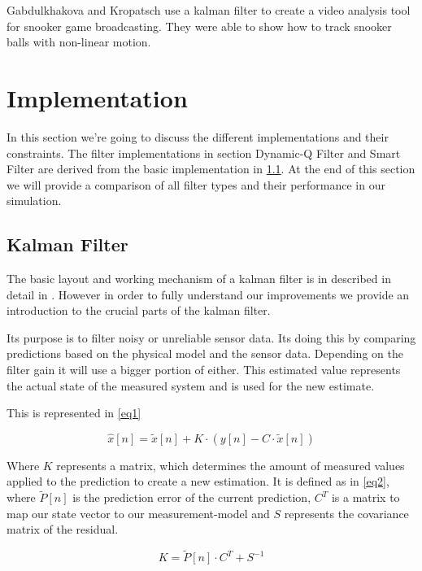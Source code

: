 \documentclass[titlepage, a4paper, 11pt]{scrartcl}
\begin{document}
Gabdulkhakova and Kropatsch \cite{kropatsch} use a kalman filter to create a video analysis tool for snooker game broadcasting.
They were able to show how to track snooker balls with non-linear motion.

\section{Implementation} \label{implementation}
In this section we're going to discuss the different implementations and their constraints. The filter implementations in section Dynamic-Q Filter and Smart Filter are derived from
the basic implementation in \cref{kalman-basic}. At the end of this section we will provide a comparison of all filter types and their performance in our simulation.

\subsection{Kalman Filter} \label{kalman-basic}

The basic layout and working mechanism of a kalman filter is in described in detail in \cite{kalman}. 
However in order to fully understand our improvements we provide an introduction to the crucial parts of the kalman filter.

Its purpose is to filter noisy or unreliable sensor data. 
Its doing this by comparing predictions based on the physical model and the sensor data. 
Depending on the filter gain it will use a bigger portion of either. 
This estimated value represents the actual state of the measured system and is used for the new estimate.

This is represented in \cref{eq1}

\begin{equation} 
    \label{eq1}
    \hat{x}[n]=\tilde{x}[n]+K\cdot(y[n]-C\cdot\tilde{x}[n])
\end{equation}

Where $K$ represents a matrix, which determines the amount of measured values applied to the prediction to create a new estimation. It is defined as in \cref{eq2}, 
where $\tilde{P}[n]$ is the prediction error of the current prediction, $C^T$ is a matrix to map our state vector to our measurement-model and $S$ represents the covariance matrix of the residual.

\begin{equation} 
    \label{eq2}
    K=\tilde{P}[n]\cdot C^T+S^{-1}
\end{equation}
\end{document}
